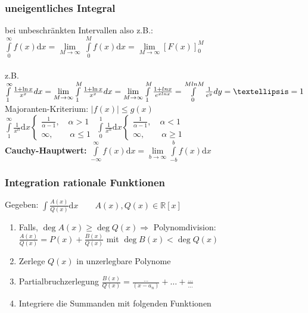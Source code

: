 \documentclass[6pt,a4paper]{scrartcl}
\newcommand{\Ra}[0]{\ensuremath{\Rightarrow}}
\newcommand{\R}{\ensuremath{\mathbb R}}
\begin{document}
\begin{multicols}{4}
\subsubsection{uneigentliches Integral}
bei unbeschränkten Intervallen also z.B.: \\
$\int\limits_0^\infty f(x) \mathrm dx = \lim\limits_{M\rightarrow \infty}\ \int\limits_{\text{0}}^M f(x) \mathrm dx = \lim\limits_{M \rightarrow \infty} [F(x)] _0^M$\\
\\
z.B. $\int\limits_{1}^{\infty} \frac{1+\ln x}{x^x} dx = \lim\limits_{M \rightarrow \infty} \int\limits_1^M \frac{1+\ln x}{x^x} dx = \lim\limits_{M \rightarrow \infty} \int\limits_1^M \frac{1+ln x}{e^{x ln x}} \\
 = \int\limits_0^{M ln M} \frac{1}{e^y} dy = … = 1$\\
Majoranten-Kriterium: $|f(x)|\le g(x)$\\
$\int\limits_{1}^{\infty} \frac{1}{x^\alpha} \mathrm dx \begin{cases} \frac{1}{\alpha -1}, \quad \alpha > 1 \\ \infty, \qquad \alpha \le 1 \end{cases}$ \qquad
$\int\limits_{0}^{1} \frac{1}{x^\alpha} \mathrm dx \begin{cases} \frac{1}{\alpha -1}, \quad \alpha < 1 \\ \infty, \qquad \alpha \ge 1 \end{cases}$\\
\textbf{Cauchy-Hauptwert:} $\int\limits_{-\infty}^{\infty} f(x) \mathrm dx = \lim\limits_{b\rightarrow\infty} \int\limits_{-b}^b f(x) \mathrm dx$

\subsubsection{Integration rationale Funktionen}
Gegeben: $\int \frac{A(x)}{Q(x)} \mathrm dx \qquad A(x),Q(x)\in \R[x]$
\begin{enumerate}\itemsep0pt
\item Falls, $\deg A(x) \ge \deg Q(x) \Ra$ Polynomdivision: \\ $\frac{A(x)}{Q(x)} = P(x) + \frac{B(x)}{Q(x)}$ mit $\deg B(x) < \deg Q(x)$
\item Zerlege $Q(x)$ in unzerlegbare Polynome
\item Partialbruchzerlegung $\frac{B(x)}{Q(x)} = \frac{\ldots}{(x - a_n)} + \ldots + \frac{\ldots}{\ldots}$
\item Integriere die Summanden mit folgenden Funktionen
\end{enumerate}


\end{multicols}
\end{document}
